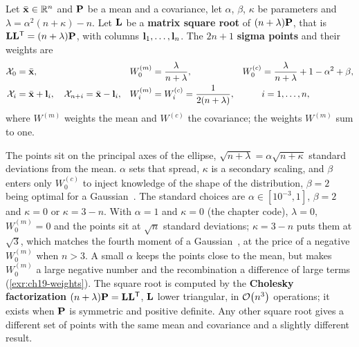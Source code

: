 \begin{definition}
\label{def:ch19-sigma}
Let $\bar{\mathbf{x}} \in \mathbb{R}^n$ and $\mathbf{P}$ be a mean and a covariance, let
$\alpha$, $\beta$, $\kappa$ be parameters and $\lambda = \alpha^2(n + \kappa)
- n$. Let $\mathbf{L}$ be a \textbf{matrix square root}
of $(n + \lambda)\mathbf{P}$, that is $\mathbf{L}\mathbf{L}^{\mathsf{T}} = (n + \lambda)\mathbf{P}$,
with columns $\mathbf{l}_1, \dots, \mathbf{l}_n$. The $2n + 1$ \textbf{sigma
points} and their weights are
\begin{equation}
  \begin{aligned}
    \mathcal{X}_0 &= \bar{\mathbf{x}}, &
    W_0^{(m)} &= \frac{\lambda}{n + \lambda}, &
    W_0^{(c)} &= \frac{\lambda}{n + \lambda} + 1 - \alpha^2 + \beta,\\
    \mathcal{X}_i &= \bar{\mathbf{x}} + \mathbf{l}_i, \quad
    \mathcal{X}_{n+i} = \bar{\mathbf{x}} - \mathbf{l}_i, &
    W_i^{(m)} &= W_i^{(c)} = \frac{1}{2(n + \lambda)}, &&
    i = 1, \dots, n,
  \end{aligned}
  \label{eq:ch19-sigma}
\end{equation}
where $W^{(m)}$ weights the mean and $W^{(c)}$ the covariance; the weights
$W^{(m)}$ sum to one.
\end{definition}

The points sit on the principal axes of the ellipse, $\sqrt{n + \lambda} =
\alpha\sqrt{n + \kappa}$ standard deviations from the mean. $\alpha$ sets
that spread, $\kappa$ is a secondary scaling, and $\beta$ enters only
$W_0^{(c)}$ to inject knowledge of the shape of the distribution, $\beta = 2$
being optimal for a Gaussian~\cite{wan2000unscented}. The standard choices
are $\alpha \in [10^{-3}, 1]$, $\beta = 2$ and $\kappa = 0$ or $\kappa = 3 -
n$. With $\alpha = 1$ and $\kappa = 0$ (the chapter code), $\lambda = 0$,
$W_0^{(m)} = 0$ and the points sit at $\sqrt{n}$ standard deviations;
$\kappa = 3 - n$ puts them at $\sqrt{3}$, which matches the fourth moment of
a Gaussian~\cite{julier1997new}, at the price of a negative $W_0^{(m)}$ when
$n > 3$. A small $\alpha$ keeps the points close to the mean, but makes
$W_0^{(m)}$ a large negative number and the recombination a difference of
large terms (\cref{exr:ch19-weights}).
The square root is computed by the \textbf{Cholesky
factorization} $(n + \lambda)\mathbf{P} =
\mathbf{L}\mathbf{L}^{\mathsf{T}}$, $\mathbf{L}$ lower triangular, in $\mathcal{O}\!\left(n^3\right)$ operations;
it exists when $\mathbf{P}$ is symmetric and positive definite. Any other
square root gives a different set of points with the same mean and
covariance and a slightly different result.

